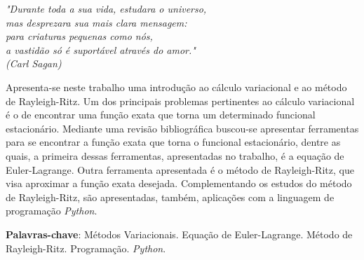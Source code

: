\documentclass[
	12pt,				%
	openright,			%
    twoside,			%
	a4paper,			%
	chapter=TITLE,		%
	english,			%
	french,				%
	spanish,			%
	brazil				%
	]{abntex2}
\numberwithin{lema}{chapter}
\numberwithin{teorema}{chapter}
\numberwithin{definicao}{chapter}
\numberwithin{exemplo}{chapter}
\numberwithin{figure}{chapter}
\renewcommand{\lstlistingname}{Código}
\renewcommand{\lstlistlistingname}{Lista de \lstlistingname s}
\let\oldlstlistoflistings\lstlistoflistings
\renewcommand{\lstlistoflistings}{%
	\begingroup%
	\let\oldnumberline\numberline%
	\renewcommand{\numberline}{\lstlistingname\space\oldnumberline}%
	\oldlstlistoflistings%
	\endgroup}
\begin{document}
\begin{epigrafe}
    \vspace*{\fill}
	\begin{flushright}
		\textit{"Durante toda a sua vida, estudara o universo, \\
		mas desprezara sua mais clara mensagem:\\
		para criaturas pequenas como nós,\\
		a vastidão só é suportável através do amor." \\
		(Carl Sagan)}
	\end{flushright}
\end{epigrafe}

\setlength{\absparsep}{18pt} %
\begin{resumo}[RESUMO]
Apresenta-se neste trabalho uma introdução ao cálculo variacional e ao método de Rayleigh-Ritz. Um dos principais problemas pertinentes ao cálculo variacional é o de encontrar uma função exata que torna um determinado funcional estacionário. Mediante uma revisão bibliográfica buscou-se apresentar ferramentas para se encontrar a função exata que torna o funcional estacionário, dentre as quais, a primeira dessas ferramentas, apresentadas no trabalho, é a equação de Euler-Lagrange. Outra ferramenta apresentada é o método de Rayleigh-Ritz, que visa aproximar a função exata desejada. Complementando os estudos do método de Rayleigh-Ritz, são apresentadas, também, aplicações com a linguagem de programação \textit{Python}.

\textbf{Palavras-chave}: Métodos Variacionais. Equação de Euler-Lagrange. Método de Rayleigh-Ritz. Programação. \textit{Python}.
\end{resumo}

\listoffigures*
\cleardoublepage

\pdfbookmark[0]{\lstlistlistingname}{lol}
\begin{KeepFromToc}
\lstlistoflistings
\end{KeepFromToc}
\cleardoublepage

\listoftables*
\cleardoublepage

\tableofcontents*
\cleardoublepage

\textual
\end{document}
